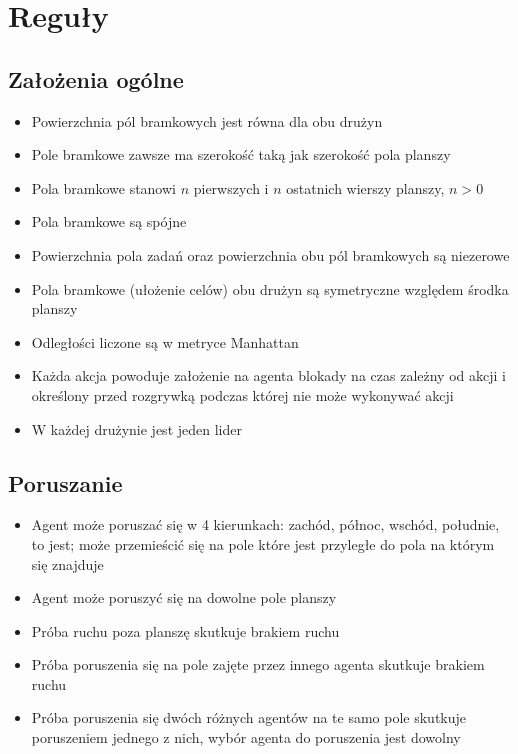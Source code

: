 \documentclass[Dokumentacja.tex]{subfiles}
\begin{document}
\section{Reguły}
\subsection{Założenia ogólne}
\begin{itemize}
    \item Powierzchnia pól bramkowych jest równa dla obu drużyn
    \item Pole bramkowe zawsze ma szerokość taką jak szerokość pola planszy
    \item Pola bramkowe stanowi $n$ pierwszych i $n$ ostatnich wierszy planszy, $n > 0$
    \item Pola bramkowe są spójne
    \item Powierzchnia pola zadań oraz powierzchnia obu pól bramkowych są niezerowe
    \item Pola bramkowe (ułożenie celów) obu drużyn są symetryczne względem środka planszy
    \item Odległości liczone są w metryce Manhattan
    \item Każda akcja powoduje założenie na agenta blokady na czas zależny od akcji i określony przed rozgrywką podczas której nie może wykonywać akcji
    \item W każdej drużynie jest jeden lider
\end{itemize}

\subsection{Poruszanie}
\begin{itemize}
    \item Agent może poruszać się w 4 kierunkach: zachód, północ, wschód, południe, to jest; może przemieścić się na pole które jest przyległe do pola na którym się znajduje
    \item Agent może poruszyć się na dowolne pole planszy
    \item Próba ruchu poza planszę skutkuje brakiem ruchu
    \item Próba poruszenia się na pole zajęte przez innego agenta skutkuje brakiem ruchu
    \item Próba poruszenia się dwóch różnych agentów na te samo pole skutkuje poruszeniem jednego z nich, wybór agenta do poruszenia jest dowolny
\end{itemize}
\end{document}

